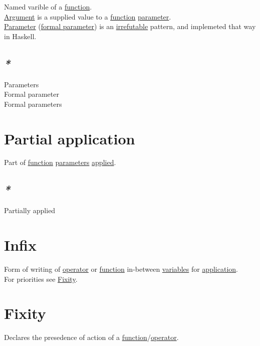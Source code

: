 \documentclass[a4paper,14pt,oneside]{book}
\begin{document}
Named varible of a \hyperref[org8cc2ae4]{function}.\\

\hyperref[org8cb9182]{Argument} is a supplied value to a \hyperref[org8cc2ae4]{function} \hyperref[orged2015b]{parameter}.\\

\hyperref[orged2015b]{Parameter} (\hyperref[org7e14d6a]{formal parameter}) is an \hyperref[orgabbcab0]{irrefutable} pattern, and implemeted that way in Haskell.\\

\subsection{\emph{*}}
\label{sec:orga82d7a2}

\label{orga6d94f6}Parameters\\
\label{org7e14d6a}Formal parameter\\
\label{org07227d7}Formal parameters\\

\section{\label{orga2d53a8}Partial application}
\label{sec:orgf8203fe}
Part of \hyperref[org8cc2ae4]{function} \hyperref[orga6d94f6]{parameters} \hyperref[orgddce002]{applied}.\\

\subsection{\emph{*}}
\label{sec:orgf8761aa}

\label{org231ab20}Partially applied\\

\section{\label{orgd49067c}Infix}
\label{sec:orgda1db21}
Form of writing of \hyperref[org3447ed4]{operator} or \hyperref[org8cc2ae4]{function} in-between \hyperref[org8831698]{variables} for \hyperref[org5c027e8]{application}.\\

For priorities see \hyperref[orgf771aee]{Fixity}.\\

\section{\label{orgf771aee}Fixity}
\label{sec:org41f4add}
Declares the presedence of action of a \hyperref[org8cc2ae4]{function}/\hyperref[org3447ed4]{operator}.\\
\end{document}

